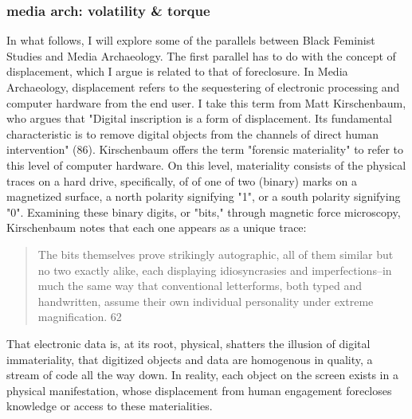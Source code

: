 \documentclass[11pt]{article}
\begin{document}
\subsubsection{media arch: volatility \& torque}
\label{sec:org7a58815}
In what follows, I will explore some of the parallels between Black
Feminist Studies and Media Archaeology. The first parallel has to do
with the concept of displacement, which I argue is related to that of
foreclosure. In Media Archaeology, displacement refers to the
sequestering of electronic processing and computer hardware from the
end user. I take this term from Matt Kirschenbaum, who argues that
"Digital inscription is a form of displacement. Its fundamental
characteristic is to remove digital objects from the channels of
direct human intervention" (86). Kirschenbaum offers the term
"forensic materiality" to refer to this level of computer hardware. On
this level, materiality consists of the physical traces on a hard
drive, specifically, of of one of two (binary) marks on a magnetized
surface, a north polarity signifying "1", or a south polarity
signifying "0". Examining these binary digits, or "bits," through
magnetic force microscopy, Kirschenbaum notes that each one appears as
a unique trace:
\begin{quote}
The bits themselves prove strikingly autographic, all of them similar
but no two exactly alike, each displaying idiosyncrasies and
imperfections--in much the same way that conventional letterforms,
both typed and handwritten, assume their own individual personality
under extreme magnification. 62
\end{quote}
That electronic data is, at its root, physical, shatters the illusion
of digital immateriality, that digitized objects and data are
homogenous in quality, a stream of code all the way down. In reality,
each object on the screen exists in a physical manifestation, whose
displacement from human engagement forecloses knowledge or access to
these materialities.
\end{document}
